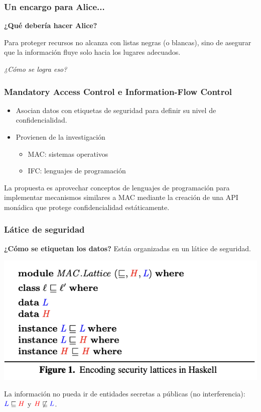 \documentclass{beamer}
\begin{document}
\begin{frame}
    \frametitle{Un encargo para Alice...}
    \textbf{¿Qué debería hacer Alice?}\newline

    Para proteger recursos no alcanza con listas negras (o blancas), sino de asegurar que la información fluye solo hacia los lugares adecuados.\newline
    \pause

    \begin{flushright}
        \it{¿Cómo se logra eso?}
    \end{flushright}

\end{frame}

\begin{frame}
    \frametitle{Mandatory Access Control e Information-Flow Control}
    \begin{itemize}
        \item Asocian datos con etiquetas de seguridad
        para definir su nivel de confidencialidad.
        \item Provienen de la investigación
        \begin{itemize}
            \item MAC: sistemas operativos
            \item IFC: lenguajes de programación
        \end{itemize}
    \end{itemize}
    La propuesta es aprovechar conceptos de lenguajes de programación para implementar mecanismos similares a MAC mediante la creación de una API monádica que protege confidencialidad estáticamente.

\end{frame}

\begin{frame}
    \frametitle{Látice de seguridad}
    \textbf{¿Cómo se etiquetan los datos?}
    Están organizadas en un látice de seguridad.
    \begin{center}
        \includegraphics[scale=0.8]{figure1.png}
    \end{center}
    La información no pueda ir de entidades secretas a públicas (no interferencia): $\textcolor{blue}{L} \sqsubseteq \textcolor{red}{H}$ y $\textcolor{red}{H} \not\sqsubseteq \textcolor{blue}{L}$.
\end{frame}
\end{document}
